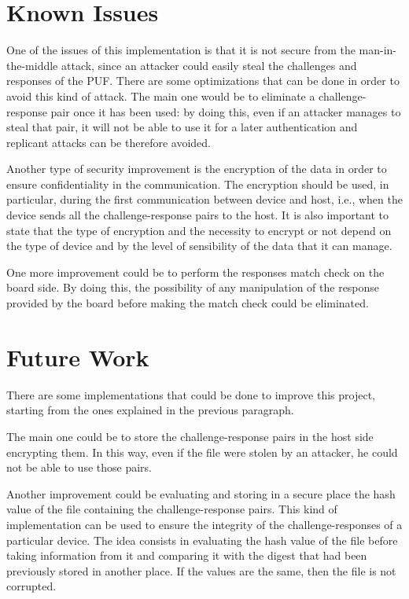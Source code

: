 \section{Known Issues}
One of the issues of this implementation is that it is not secure from the man-in-the-middle attack, since an attacker could easily steal the challenges and responses of the PUF.
There are some optimizations that can be done in order to avoid this kind of attack.
The main one would be to eliminate a challenge-response pair once it has been used: by doing this, even if an attacker manages to steal that pair, it will not be able to use it for a later authentication and replicant attacks can be therefore avoided.

Another type of security improvement is the encryption of the data in order to ensure confidentiality in the communication. The encryption should be used, in particular, during the first communication between device and host, i.e., when the device sends all the challenge-response pairs to the host.
It is also important to state that the type of encryption and the necessity to encrypt or not depend on the type of device and by the level of sensibility of the data that it can manage.

One more improvement could be to perform the responses match check on the board side. By doing this, the possibility of any manipulation of the response provided by the board before making the match check could be eliminated.


\section{Future Work}
There are some implementations that could be done to improve this project, starting from the ones explained in the previous paragraph.

The main one could be to store the challenge-response pairs in the host side encrypting them. In this way, even if the file were stolen by an attacker, he could not be able to use those pairs.

Another improvement could be evaluating and storing in a secure place the hash value of the file containing the challenge-response pairs.
This kind of implementation can be used to ensure the integrity of the challenge-responses of a particular device.
The idea consists in evaluating the hash value of the file before taking information from it and comparing it with the digest that had been previously stored in another place. If the values are the same, then the file is not corrupted.



